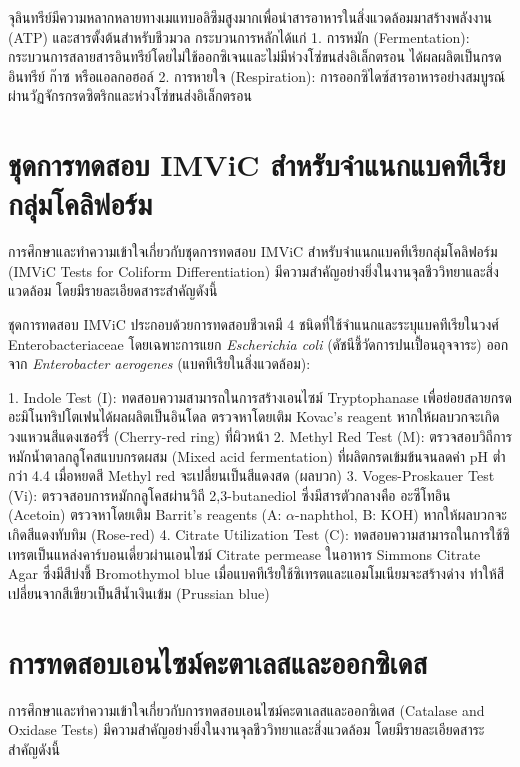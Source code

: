 จุลินทรีย์มีความหลากหลายทางเมแทบอลิซึมสูงมากเพื่อนำสารอาหารในสิ่งแวดล้อมมาสร้างพลังงาน (ATP) และสารตั้งต้นสำหรับชีวมวล กระบวนการหลักได้แก่ 
1. การหมัก (Fermentation): กระบวนการสลายสารอินทรีย์โดยไม่ใช้ออกซิเจนและไม่มีห่วงโซ่ขนส่งอิเล็กตรอน ได้ผลผลิตเป็นกรดอินทรีย์ ก๊าซ หรือแอลกอฮอล์
2. การหายใจ (Respiration): การออกซิไดซ์สารอาหารอย่างสมบูรณ์ผ่านวัฏจักรกรดซิตริกและห่วงโซ่ขนส่งอิเล็กตรอน

\section{ชุดการทดสอบ IMViC สำหรับจำแนกแบคทีเรียกลุ่มโคลิฟอร์ม}

การศึกษาและทำความเข้าใจเกี่ยวกับชุดการทดสอบ IMViC สำหรับจำแนกแบคทีเรียกลุ่มโคลิฟอร์ม (IMViC Tests for Coliform Differentiation) มีความสำคัญอย่างยิ่งในงานจุลชีววิทยาและสิ่งแวดล้อม โดยมีรายละเอียดสาระสำคัญดังนี้

ชุดการทดสอบ IMViC ประกอบด้วยการทดสอบชีวเคมี 4 ชนิดที่ใช้จำแนกและระบุแบคทีเรียในวงศ์ Enterobacteriaceae โดยเฉพาะการแยก \textit{Escherichia coli} (ดัชนีชี้วัดการปนเปื้อนอุจจาระ) ออกจาก \textit{Enterobacter aerogenes} (แบคทีเรียในสิ่งแวดล้อม):

1. Indole Test (I): ทดสอบความสามารถในการสร้างเอนไซม์ Tryptophanase เพื่อย่อยสลายกรดอะมิโนทริปโตเฟนได้ผลผลิตเป็นอินโดล ตรวจหาโดยเติม Kovac's reagent หากให้ผลบวกจะเกิดวงแหวนสีแดงเชอร์รี่ (Cherry-red ring) ที่ผิวหน้า
2. Methyl Red Test (M): ตรวจสอบวิถีการหมักน้ำตาลกลูโคสแบบกรดผสม (Mixed acid fermentation) ที่ผลิตกรดเข้มข้นจนลดค่า pH ต่ำกว่า 4.4 เมื่อหยดสี Methyl red จะเปลี่ยนเป็นสีแดงสด (ผลบวก)
3. Voges-Proskauer Test (Vi): ตรวจสอบการหมักกลูโคสผ่านวิถี 2,3-butanediol ซึ่งมีสารตัวกลางคือ อะซีโทอิน (Acetoin) ตรวจหาโดยเติม Barrit's reagents (A: $\alpha$-naphthol, B: KOH) หากให้ผลบวกจะเกิดสีแดงทับทิม (Rose-red)
4. Citrate Utilization Test (C): ทดสอบความสามารถในการใช้ซิเทรตเป็นแหล่งคาร์บอนเดี่ยวผ่านเอนไซม์ Citrate permease ในอาหาร Simmons Citrate Agar ซึ่งมีสีบ่งชี้ Bromothymol blue เมื่อแบคทีเรียใช้ซิเทรตและแอมโมเนียมจะสร้างด่าง ทำให้สีเปลี่ยนจากสีเขียวเป็นสีน้ำเงินเข้ม (Prussian blue)

\section{การทดสอบเอนไซม์คะตาเลสและออกซิเดส}

การศึกษาและทำความเข้าใจเกี่ยวกับการทดสอบเอนไซม์คะตาเลสและออกซิเดส (Catalase and Oxidase Tests) มีความสำคัญอย่างยิ่งในงานจุลชีววิทยาและสิ่งแวดล้อม โดยมีรายละเอียดสาระสำคัญดังนี้

